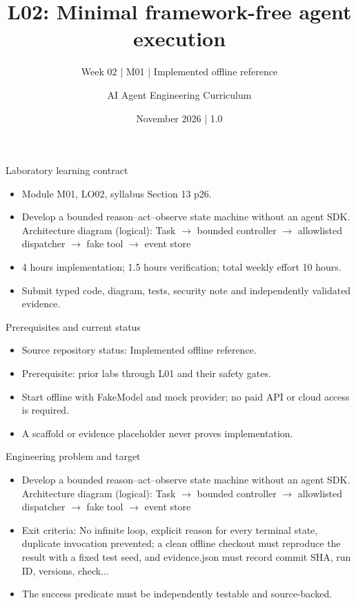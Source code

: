 \documentclass[aspectratio=169,10pt]{beamer}
\title[L02 - Agent Engineering]{L02: Minimal framework-free agent execution}
\subtitle{Week 02 | M01 | Implemented offline reference}
\author{AI Agent Engineering Curriculum}
\date{November 2026 | 1.0}
\begin{document}
\begin{frame}\titlepage\end{frame}

\begin{frame}{Laboratory learning contract}
\small
\begin{itemize}
\item Module M01, LO02, syllabus Section 13 p26.
\item Develop a bounded reason--act--observe state machine without an agent SDK. Architecture diagram (logical): Task $\rightarrow$ bounded controller $\rightarrow$ allowlisted dispatcher $\rightarrow$ fake tool $\rightarrow$ event store
\item 4 hours implementation; 1.5 hours verification; total weekly effort 10 hours.
\item Submit typed code, diagram, tests, security note and independently validated evidence.
\end{itemize}

\end{frame}

\begin{frame}{Prerequisites and current status}
\small
\begin{itemize}
\item Source repository status: Implemented offline reference.
\item Prerequisite: prior labs through L01 and their safety gates.
\item Start offline with FakeModel and mock provider; no paid API or cloud access is required.
\item A scaffold or evidence placeholder never proves implementation.
\end{itemize}

\end{frame}

\begin{frame}{Engineering problem and target}
\small
\begin{itemize}
\item Develop a bounded reason--act--observe state machine without an agent SDK. Architecture diagram (logical): Task $\rightarrow$ bounded controller $\rightarrow$ allowlisted dispatcher $\rightarrow$ fake tool $\rightarrow$ event store
\item Exit criteria: No infinite loop, explicit reason for every terminal state, duplicate invocation prevented; a clean offline checkout must reproduce the result with a fixed test seed, and evidence.json must record commit SHA, run ID, versions, check...
\item The success predicate must be independently testable and source-backed.
\end{itemize}

\end{frame}
\end{document}
